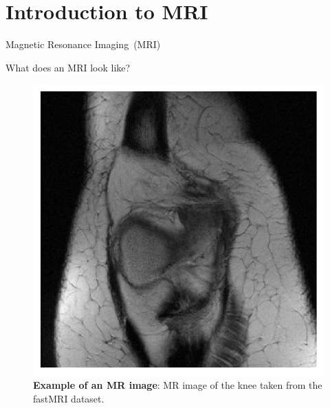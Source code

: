 \section{Introduction to MRI}

\begin{frame}[plain,c]
    
    \begin{center}
        \color{DarkBlue}
    \Huge Magnetic Resonance Imaging~(MRI)
    \end{center}
    
\end{frame}

\begin{frame}{What does an MRI look like?}
    \begin{figure}
        \centering
        \includegraphics[height=0.6\textheight]{Figures/intro_figures/example_knee_fastmri.pdf}
        \caption{\label{fig:mri-example} \textbf{Example of an MR image}: MR image of the knee taken from the fastMRI dataset.}
    \end{figure}
\end{frame}

